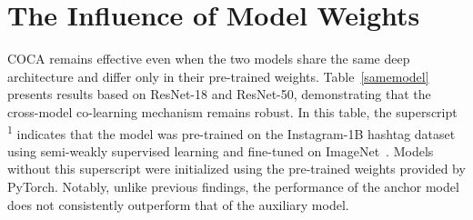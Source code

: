 \begin{table}[t]
\setlength{\tabcolsep}{11pt} %
    \renewcommand{\arraystretch}{0.9} %
\vspace{-0.1in}
\caption{Further explanation of Fig.~\ref{samplelevel} on how COCA makes accurate predictions for these two samples. The values, all less than 10, represent the predicted logits. }
\label{Sampleleveltable}
\vspace{-0.2in}
\end{table}


\section{The Influence of Model Weights}
\label{weights}
COCA remains effective even when the two models share the same deep architecture and differ only in their pre-trained weights. Table~\ref{samemodel} presents results based on ResNet-18 and ResNet-50, demonstrating that the cross-model co-learning mechanism remains robust. In this table, the superscript \textsuperscript{1} indicates that the model was pre-trained on the Instagram-1B hashtag dataset using semi-weakly supervised learning and fine-tuned on ImageNet~\cite{he2016deep}. Models without this superscript were initialized using the pre-trained weights provided by PyTorch. Notably, unlike previous findings, the performance of the anchor model does not consistently outperform that of the auxiliary model.



